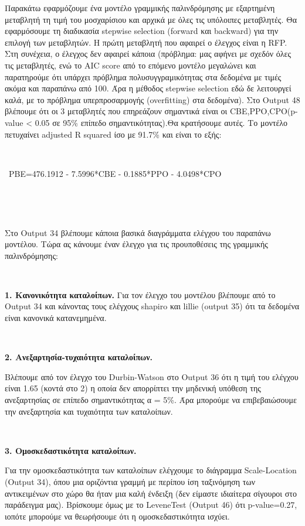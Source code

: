 \documentclass[10pt]{article}
\begin{document}
Παρακάτω εφαρμόζουμε ένα μοντέλο γραμμικής παλινδρόμησης με εξαρτημένη μεταβλητή τη τιμή του μοσχαρίσιου και αρχικά με όλες τις υπόλοιπες μεταβλητές. Θα εφαρμόσουμε τη διαδικασία stepwise selection (forward και backward) για την επιλογή των μεταβλητών. Η πρώτη μεταβλητή που αφαιρεί ο έλεγχος είναι η RFP. Στη συνέχεια, ο έλεγχος δεν αφαιρεί κάποια (πρόβλημα: μας αφήνει με σχεδόν όλες τις μεταβλητές, ενώ το AIC score από το επόμενο μοντέλο μεγαλώνει και παρατηρούμε ότι υπάρχει πρόβλημα πολυσυγγραμικότητας στα δεδομένα με τιμές ακόμα και παραπάνω από 100. Άρα η μέθοδος stepwise selection εδώ δε λειτουργεί καλά, με το πρόβλημα υπερπροσαρμογής (overfitting) στα δεδομένα). Στο Output 48 βλέπουμε ότι οι 3 μεταβλητές που επηρεάζουν σημαντικά είναι οι CBE,PPO,CPO(p-value < 0.05 σε 95\% επίπεδο σημαντικότητας).Θα κρατήσουμε αυτές. Το μοντέλο πετυχαίνει adjusted R squared ίσο με 91.7\% και είναι το εξής:
\

\

\
PBE=476.1912 - 7.5996*CBE - 0.1885*PPO - 4.0498*CPO 

\

\

Στο Output 34 βλέπουμε κάποια βασικά διαγράμματα ελέγχου του παραπάνω μοντέλου. Τώρα ας κάνουμε έναν έλεγχο για τις προυποθέσεις της γραμμικής παλινδρόμησης:
\

\

\textbf {1. Κανονικότητα καταλοίπων.}
Για τον έλεγχο του μοντέλου βλέπουμε από το Output 34 και κάνοντας τους ελέγχους  shapiro και lillie (output 35) ότι τα δεδομένα είναι κανονικά κατανεμημένα. 

\

\textbf{2. Ανεξαρτησία-τυχαιότητα καταλοίπων.}

Βλέπουμε από τον έλεγχο του Durbin-Watson στο Output 36 ότι η τιμή του ελέγχου είναι 1.65 (κοντά στο 2) η οποία δεν απορρίπτει την μηδενική υπόθεση της ανεξαρτησίας σε επίπεδο σημαντικότητας α = 5\%. Άρα μπορούμε να επιβεβαιώσουμε την ανεξαρτησία και τυχαιότητα των καταλοίπων.

\

\textbf{3. Ομοσκεδαστικότητα καταλοίπων.}

Για την ομοσκεδαστικότητα των καταλοίπων ελέγχουμε το διάγραμμα Scale-Location (Output 34), όπου μια οριζόντια γραμμή με περίπου ίση ταξινόμηση των αντικειμένων στο χώρο θα ήταν μια καλή ένδειξη (δεν είμαστε ιδιαίτερα σίγουροι στο παράδειγμα μας). Βρίσκουμε όμως με το LeveneTest (Output 46) ότι p-value=0.27, ιοπότε μπορούμε να θεωρήσουμε ότι η ομοσκεδαστικότητα ισχύει.
\end{document}
